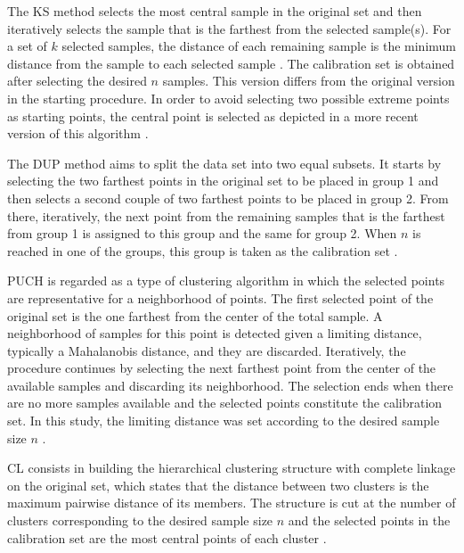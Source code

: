 \documentclass[journal=ancham,manuscript=article]{achemso}
\begin{document}
The KS method selects the most central sample in the original set and then iteratively selects the sample that is the farthest from the selected sample(s). For a set of $k$ selected samples, the distance of each remaining sample is the minimum distance from the sample to each selected sample \cite{Kennard1969}. The calibration set is obtained after selecting the desired $n$ samples. This version differs from the original version in the starting procedure. In order to avoid selecting two possible extreme points as starting points, the central point is selected as depicted in a more recent version of this algorithm \cite{Ramirez-Lopez2014}.

The DUP method aims to split the data set into two equal subsets. It starts by selecting the two farthest points in the original set to be placed in group 1 and then selects a second couple of two farthest points to be placed in group 2. From there, iteratively, the next point from the remaining samples that is the farthest from group 1 is assigned to this group and the same for group 2. When $n$ is reached in one of the groups, this group is taken as the calibration set \cite{Snee1977}.

PUCH is regarded as a type of clustering algorithm in which the selected points are representative for a neighborhood of points. The first selected point of the original set is the one farthest from the center of the total sample. A neighborhood of samples for this point is detected given a limiting distance, typically a Mahalanobis distance, and they are discarded. Iteratively, the procedure continues by selecting the next farthest point from the center of the available samples and discarding its neighborhood. The selection ends when there are no more samples available and the selected points constitute the calibration set. In this study, the limiting distance was set according to the desired sample size $n$ \cite{Puchwein1988}.

CL consists in building the hierarchical clustering structure with complete linkage on the original set, which states that the distance between two clusters is the maximum pairwise distance of its members. The structure is cut at the number of clusters corresponding to the desired sample size $n$ and the selected points in the calibration set are the most central points of each cluster \cite{Naes1990}.
\end{document}
